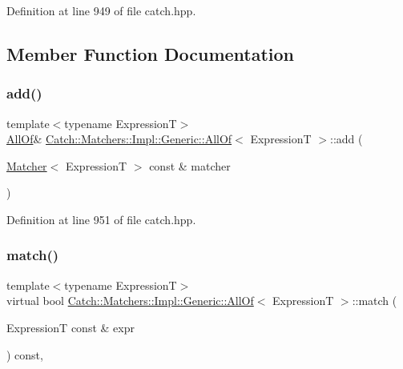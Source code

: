 Definition at line 949 of file catch.\+hpp.



\subsection{Member Function Documentation}
\hypertarget{class_catch_1_1_matchers_1_1_impl_1_1_generic_1_1_all_of_a8c5cd1e494ab697076da418ee72ac297}{}\label{class_catch_1_1_matchers_1_1_impl_1_1_generic_1_1_all_of_a8c5cd1e494ab697076da418ee72ac297} 
\subsubsection{\texorpdfstring{add()}{add()}}
{\footnotesize\ttfamily template$<$typename ExpressionT$>$ \\
\hyperlink{class_catch_1_1_matchers_1_1_impl_1_1_generic_1_1_all_of}{All\+Of}\& \hyperlink{class_catch_1_1_matchers_1_1_impl_1_1_generic_1_1_all_of}{Catch\+::\+Matchers\+::\+Impl\+::\+Generic\+::\+All\+Of}$<$ ExpressionT $>$\+::add (\begin{DoxyParamCaption}\item[{\hyperlink{struct_catch_1_1_matchers_1_1_impl_1_1_matcher}{Matcher}$<$ ExpressionT $>$ const \&}]{matcher }\end{DoxyParamCaption})\hspace{0.3cm}{\ttfamily [inline]}}



Definition at line 951 of file catch.\+hpp.

\hypertarget{class_catch_1_1_matchers_1_1_impl_1_1_generic_1_1_all_of_a95231b6a455e1a646d0b54bce55138be}{}\label{class_catch_1_1_matchers_1_1_impl_1_1_generic_1_1_all_of_a95231b6a455e1a646d0b54bce55138be} 
\subsubsection{\texorpdfstring{match()}{match()}}
{\footnotesize\ttfamily template$<$typename ExpressionT$>$ \\
virtual bool \hyperlink{class_catch_1_1_matchers_1_1_impl_1_1_generic_1_1_all_of}{Catch\+::\+Matchers\+::\+Impl\+::\+Generic\+::\+All\+Of}$<$ ExpressionT $>$\+::match (\begin{DoxyParamCaption}\item[{ExpressionT const \&}]{expr }\end{DoxyParamCaption}) const\hspace{0.3cm}{\ttfamily [inline]}, {\ttfamily [virtual]}}



